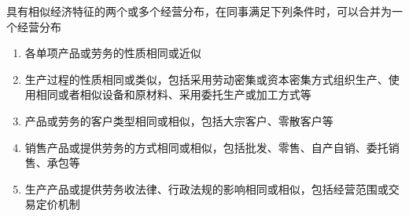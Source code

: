 \documentclass[UTF8,12pt]{ctexart}
\numberwithin{equation}{section} %
\numberwithin{figure}{section}
\numberwithin{table}{section}
\begin{document}
	具有相似经济特征的两个或多个经营分布，在同事满足下列条件时，可以合并为一个经营分布
	\begin{enumerate}
		\item 各单项产品或劳务的性质相同或近似
		
		\item 生产过程的性质相同或类似，包括采用劳动密集或资本密集方式组织生产、使用相同或者相似设备和原材料、采用委托生产或加工方式等
		
		\item 产品或劳务的客户类型相同或相似，包括大宗客户、零散客户等
		
		\item 销售产品或提供劳务的方式相同或相似，包括批发、零售、自产自销、委托销售、承包等
		
		\item 生产产品或提供劳务收法律、行政法规的影响相同或相似，包括经营范围或交易定价机制
	\end{enumerate}
	
\end{document}
